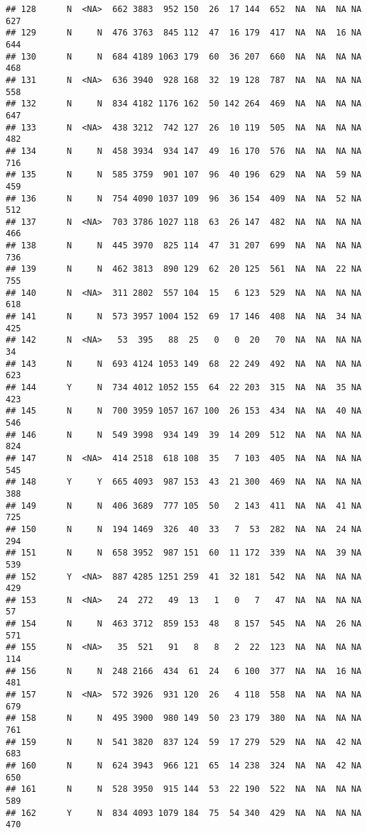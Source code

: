 \documentclass[]{article}
\begin{document}
\begin{verbatim}
## 128      N  <NA>  662 3883  952 150  26  17 144  652  NA  NA  NA NA  627
## 129      N     N  476 3763  845 112  47  16 179  417  NA  NA  16 NA  644
## 130      N     N  684 4189 1063 179  60  36 207  660  NA  NA  NA NA  468
## 131      N  <NA>  636 3940  928 168  32  19 128  787  NA  NA  NA NA  558
## 132      N     N  834 4182 1176 162  50 142 264  469  NA  NA  NA NA  647
## 133      N  <NA>  438 3212  742 127  26  10 119  505  NA  NA  NA NA  482
## 134      N     N  458 3934  934 147  49  16 170  576  NA  NA  NA NA  716
## 135      N     N  585 3759  901 107  96  40 196  629  NA  NA  59 NA  459
## 136      N     N  754 4090 1037 109  96  36 154  409  NA  NA  52 NA  512
## 137      N  <NA>  703 3786 1027 118  63  26 147  482  NA  NA  NA NA  466
## 138      N     N  445 3970  825 114  47  31 207  699  NA  NA  NA NA  736
## 139      N     N  462 3813  890 129  62  20 125  561  NA  NA  22 NA  755
## 140      N  <NA>  311 2802  557 104  15   6 123  529  NA  NA  NA NA  618
## 141      N     N  573 3957 1004 152  69  17 146  408  NA  NA  34 NA  425
## 142      N  <NA>   53  395   88  25   0   0  20   70  NA  NA  NA NA   34
## 143      N     N  693 4124 1053 149  68  22 249  492  NA  NA  NA NA  623
## 144      Y     N  734 4012 1052 155  64  22 203  315  NA  NA  35 NA  423
## 145      N     N  700 3959 1057 167 100  26 153  434  NA  NA  40 NA  546
## 146      N     N  549 3998  934 149  39  14 209  512  NA  NA  NA NA  824
## 147      N  <NA>  414 2518  618 108  35   7 103  405  NA  NA  NA NA  545
## 148      Y     Y  665 4093  987 153  43  21 300  469  NA  NA  NA NA  388
## 149      N     N  406 3689  777 105  50   2 143  411  NA  NA  41 NA  725
## 150      N     N  194 1469  326  40  33   7  53  282  NA  NA  24 NA  294
## 151      N     N  658 3952  987 151  60  11 172  339  NA  NA  39 NA  539
## 152      Y  <NA>  887 4285 1251 259  41  32 181  542  NA  NA  NA NA  429
## 153      N  <NA>   24  272   49  13   1   0   7   47  NA  NA  NA NA   57
## 154      N     N  463 3712  859 153  48   8 157  545  NA  NA  26 NA  571
## 155      N  <NA>   35  521   91   8   8   2  22  123  NA  NA  NA NA  114
## 156      N     N  248 2166  434  61  24   6 100  377  NA  NA  16 NA  481
## 157      N  <NA>  572 3926  931 120  26   4 118  558  NA  NA  NA NA  679
## 158      N     N  495 3900  980 149  50  23 179  380  NA  NA  NA NA  761
## 159      N     N  541 3820  837 124  59  17 279  529  NA  NA  42 NA  683
## 160      N     N  624 3943  966 121  65  14 238  324  NA  NA  42 NA  650
## 161      N     N  528 3950  915 144  53  22 190  522  NA  NA  NA NA  589
## 162      Y     N  834 4093 1079 184  75  54 340  429  NA  NA  NA NA  470

\end{verbatim}
\end{document}
